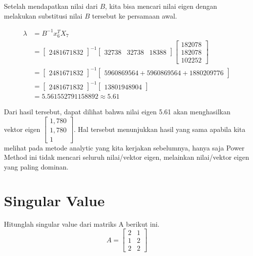 \documentclass{article}
\begin{document}
Setelah mendapatkan nilai dari $B$, kita bisa mencari nilai eigen dengan melakukan substitusi nilai $B$ tersebut ke persamaan awal.

\begin{align*}
    \lambda &= B^{-1}x_6^TX_{7}\\
     &= 
    \begin{bmatrix}
        2481671832
    \end{bmatrix}^{-1}
    \begin{bmatrix}
        32738 & 32738 & 18388
    \end{bmatrix}
    \begin{bmatrix}
        182078\\
        182078\\
        102252
    \end{bmatrix}\\
    &= 
    \begin{bmatrix}
        2481671832
    \end{bmatrix}^{-1}
    \begin{bmatrix}
        5960869564 + 5960869564 + 1880209776
    \end{bmatrix}\\
    &= 
    \begin{bmatrix}
        2481671832
    \end{bmatrix}^{-1}
    \begin{bmatrix}
        13801948904
    \end{bmatrix}\\
    &= 5.561552791158892 \approx 5.61
\end{align*}

Dari hasil tersebut, dapat dilihat bahwa nilai eigen 5.61 akan menghasilkan vektor eigen $\begin{bmatrix}
    1,780\\1,780\\1
\end{bmatrix}$. Hal tersebut menunjukkan hasil yang sama apabila kita melihat pada metode analytic yang kita kerjakan sebelumnya, hanya saja Power Method ini tidak mencari seluruh nilai/vektor eigen, melainkan nilai/vektor eigen yang paling dominan.

\part{Singular Value}
Hitunglah singular value dari matriks A berikut ini.
$$
A =
\begin{bmatrix}
    2 & 1\\
    1 & 2\\
    2 & 2
\end{bmatrix}
$$
\end{document}
